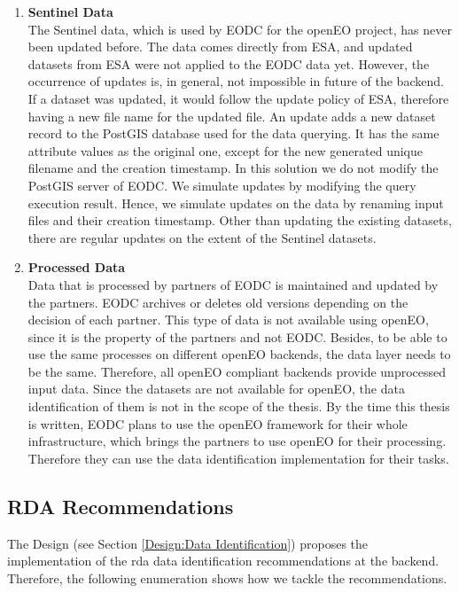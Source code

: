 \documentclass[draft,final]{vutinfth} %
\newcommand{\bgoesswein}[1]{{\color{blue}#1}}
\begin{document}
\begin{enumerate}
	\item \textbf{Sentinel Data} \\
	The Sentinel data, which is used by EODC for the openEO project, has never been updated before. The data comes directly from ESA, and updated datasets from ESA were not applied to the EODC data yet. However, the occurrence of updates is, in general, not impossible in future of the backend. If a dataset was updated, it would follow the update policy of ESA, therefore having a new file name for the updated file. \bgoesswein{An update adds a new dataset record to the PostGIS database used for the data querying. It has the same attribute values as the original one, except for the new generated unique filename and the creation timestamp. In this solution we do not modify the PostGIS server of EODC. We simulate updates by modifying the query execution result.} Hence, we simulate updates on the data by renaming input files and their creation timestamp. Other than updating the existing datasets, there are regular updates on the extent of the Sentinel datasets.   
	\item \textbf{Processed Data} \\
	Data that is processed by partners of EODC is maintained and updated by the partners. EODC archives or deletes old versions depending on the decision of each partner. This type of data is not available using openEO, since it is the property of the partners and not EODC. Besides, to be able to use the same processes on different openEO backends, the data layer needs to be the same. Therefore, all openEO compliant backends provide unprocessed input data. Since the datasets are not available for openEO, the data identification of them is not in the scope of the thesis. By the time this thesis is written, EODC plans to use the openEO framework for their whole infrastructure, which brings the partners to use openEO for their processing. Therefore they can use the data identification implementation for their tasks.
\end{enumerate}

\subsection{RDA Recommendations}\label{Evaluation:dataidentification}
The Design (see Section \ref{Design:Data Identification}) proposes the implementation of the \acrshort{rda} data identification recommendations at the backend. Therefore, the following enumeration shows how we tackle the recommendations. 
\end{document}

